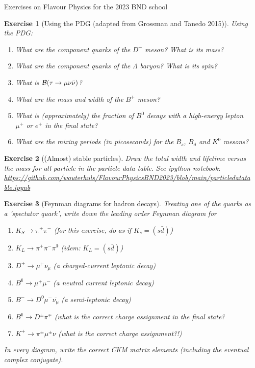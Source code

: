 \documentclass[12pt]{article}
\newcommand{\nbexercise}[1]{\url{https://github.com/wouterhuls/FlavourPhysicsBND2023/blob/main/#1}}
\newtheorem{homeworkexercise}{Exercise}
\newenvironment{enumexercise}{
  \renewcommand{\labelenumi}{\bfseries{(\alph{enumi})}}
  \leavevmode\begin{enumerate}}{\end{enumerate}\vspace{5pt}}
\newcommand{\Br}[1]{{\cal B}(#1)}
\begin{document}
\centerline{\Large Exercises on Flavour Physics for the 2023 BND school}


\begin{homeworkexercise}[Using the PDG (adapted from Grossman and Tanedo 2015)]  
  Using the PDG:
  \begin{enumexercise}
  \item What are the component quarks of the $D^+$ meson? What is its mass? 
  \item What are the component quarks of the $\Lambda$ baryon? What is its spin?
  \item What is $\Br{\tau \to \mu \nu \bar{\nu}}$?
  \item What are the mass and width of the $B^+$ meson?
  \item What is (approximately) the fraction of $B^0$ decays with a high-energy lepton $\mu^+$ or $e^+$ in the final state?
  \item What are the mixing periods (in picoseconds) for the $B_s$, $B_d$ and $K^0$ mesons?
  \end{enumexercise}
\end{homeworkexercise}

\begin{homeworkexercise}[(Almost) stable particles]
  Draw the total width and lifetime versus the mass for all particle in the particle data table. See ipython notebook:
  \nbexercise{particledatatable.ipynb}
\end{homeworkexercise} 

\begin{homeworkexercise}[Feynman diagrams for hadron decays]
  Treating one of the quarks as a 'spectator quark', write down the leading order Feynman diagram for
  \begin{enumexercise}
  \item $K_S \to \pi^+ \pi^-$ (for this exercise, do as if $K_s = (s\bar{d})$)
  \item $K_L \to \pi^+ \pi^- \pi^0$ (idem: $K_L = (s\bar{d})$)
  \item $D^+ \to \mu^+ \nu_\mu$ (a charged-current leptonic decay)
  \item $B^0 \to \mu^+ \mu^-$ (a neutral current leptonic decay)
  \item $B^- \to D^0 \mu^- \bar{\nu_\mu}$ (a semi-leptonic decay)
  \item $B^0 \to D^\pm \pi^\mp$ (what is the correct charge assignment in the final state?
  \item $K^+ \to \pi^\pm \mu^\pm \nu$ (what is the correct charge assignment?!) 
  \end{enumexercise}
  In every diagram, write the correct CKM matrix elements (including the eventual complex conjugate).
\end{homeworkexercise}
\end{document}
